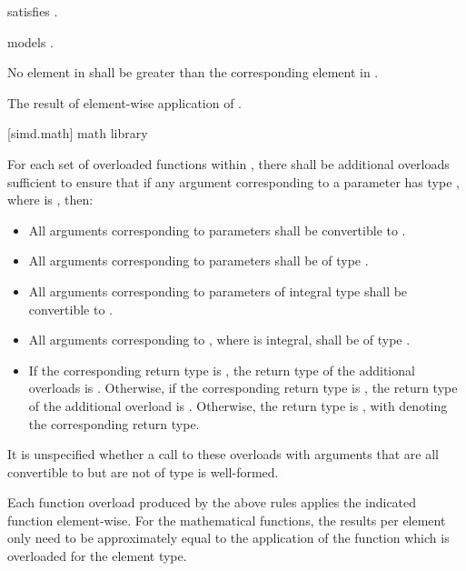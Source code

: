 \begin{itemdescr}
  \pnum\constraints
   satisfies .

  \pnum\expects
   models .

  \pnum\requires
  No element in  shall be greater than the corresponding element in .

  \pnum\returns
  The result of element-wise application of  \foralli.
\end{itemdescr}

[simd.math]{\texorpdfstring{ math}{simd math} library}

\pnum
For each set of overloaded functions within , there shall be additional overloads sufficient to ensure that if any argument corresponding to a  parameter has type , where  is , then:
\begin{itemize}
  \item All arguments corresponding to  parameters shall be convertible to .
  \item All arguments corresponding to  parameters shall be of type .
  \item All arguments corresponding to parameters of integral type  shall be convertible to .
  \item All arguments corresponding to , where  is integral, shall be of type .
  \item If the corresponding return type is , the return type of the additional overloads is . Otherwise, if the corresponding return type is , the return type of the additional overload is . Otherwise, the return type is , with  denoting the corresponding return type.
\end{itemize}
It is unspecified whether a call to these overloads with arguments that are all convertible to  but are not of type  is well-formed.

\pnum
Each function overload produced by the above rules applies the indicated  function element-wise. For the mathematical functions, the results per element only need to be approximately equal to the application of the function which is overloaded for the element type.

